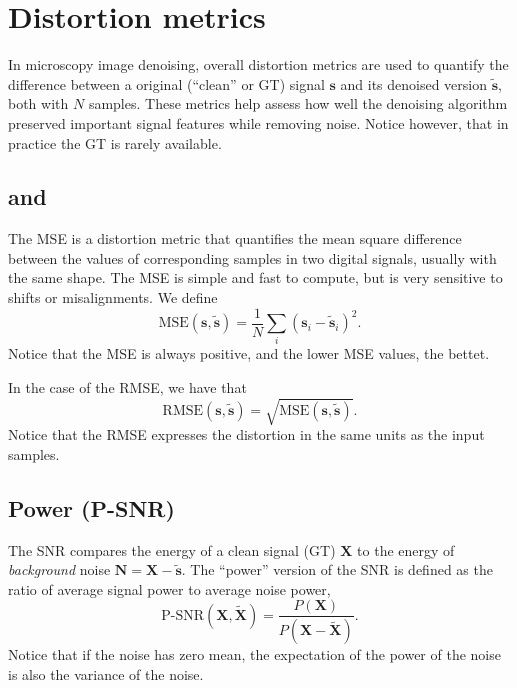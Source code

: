 \chapter{Distortion metrics}
In microscopy image denoising, overall distortion metrics are used to
quantify the difference between a original (``clean'' or \gls{GT})
signal $\mathbf{s}$ and its denoised version $\tilde{\mathbf{s}}$,
both with $N$ samples. These metrics help assess how well the
denoising algorithm preserved important signal features while removing
noise. Notice however, that in practice the \gls{GT} is rarely
available.

\section{ and }

The \acrshort{MSE} is a distortion metric that quantifies the mean square
difference between the values of corresponding samples in two digital
signals, usually with the same shape. The \gls{MSE} is simple and fast to
compute, but is very sensitive to shifts or misalignments. We define
\begin{equation}
  \text{MSE}(\mathbf{s},\tilde{\mathbf{s}}) = \frac{1}{N}\sum_i(\mathbf{s}_i - \tilde{\mathbf{s}}_i)^2.
  \label{eq:MSE}
\end{equation}
Notice that the \gls{MSE} is always positive, and the lower
\gls{MSE} values, the bettet.

In the case of the \acrshort{RMSE}, we have that
\begin{equation}
  \text{RMSE}(\mathbf{s},\tilde{\mathbf{s}}) = \sqrt{\text{MSE}(\mathbf{s},\tilde{\mathbf{s}})}.
  \label{eq:RMSE}
\end{equation}
Notice that the \gls{RMSE} expresses the distortion in the same units as the
input samples.


\section{Power  (P-\gls{SNR})}

The \acrshort{SNR} compares the energy of a clean signal (\gls{GT})
$\bm{X}$ to the energy of \emph{background} noise
$\bm{N}=\bm{X}-\tilde{\bm{s}}$. The ``power'' version of the \gls{SNR} is defined as the ratio of average signal
power to average noise power,
\begin{equation}
  \text{P-SNR}(\bm{X},\tilde{\bm{X}}) = \frac{P(\bm{X})}{P(\bm{X} - \tilde{\bm{X}})}.
  \label{eq:power_SNR}
\end{equation}
Notice that if the noise has zero mean, the expectation
of the power of the noise is also the variance of the noise.

